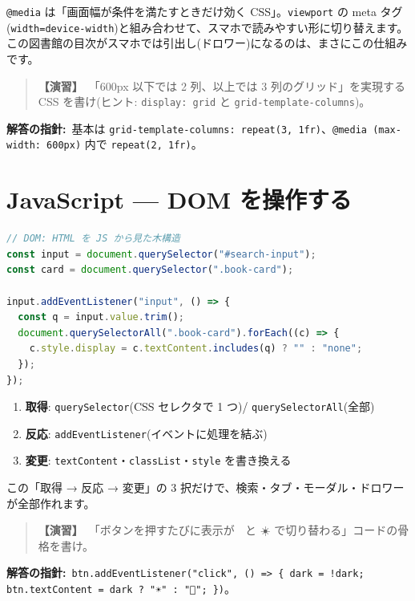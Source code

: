 \documentclass{article}
\begin{document}
\texttt{@media} は「画面幅が条件を満たすときだけ効く CSS」。\texttt{viewport} の meta タグ(\texttt{width=device-width})と組み合わせて、スマホで読みやすい形に切り替えます。この図書館の目次がスマホでは引出し(ドロワー)になるのは、まさにこの仕組みです。

\begin{quote}
\textbf{【演習】}\ 「600px 以下では 2 列、以上では 3 列のグリッド」を実現する CSS を書け(ヒント: \texttt{display: grid} と \texttt{grid-template-columns})。
\end{quote}

\textbf{解答の指針:}\ 基本は \texttt{grid-template-columns: repeat(3, 1fr)}、\texttt{@media (max-width: 600px)} 内で \texttt{repeat(2, 1fr)}。

\section{JavaScript — DOM を操作する}

\begin{lstlisting}[language=JavaScript]
// DOM: HTML を JS から見た木構造
const input = document.querySelector("#search-input");
const card = document.querySelector(".book-card");

input.addEventListener("input", () => {
  const q = input.value.trim();
  document.querySelectorAll(".book-card").forEach((c) => {
    c.style.display = c.textContent.includes(q) ? "" : "none";
  });
});
\end{lstlisting}

\begin{enumerate}
\item \textbf{取得}: \texttt{querySelector}(CSS セレクタで 1 つ)/ \texttt{querySelectorAll}(全部)
\item \textbf{反応}: \texttt{addEventListener}(イベントに処理を結ぶ)
\item \textbf{変更}: \texttt{textContent}・\texttt{classList}・\texttt{style} を書き換える
\end{enumerate}
この「取得 → 反応 → 変更」の 3 択だけで、検索・タブ・モーダル・ドロワーが全部作れます。

\begin{quote}
\textbf{【演習】}\ 「ボタンを押すたびに表示が 🌙 と ☀️ で切り替わる」コードの骨格を書け。
\end{quote}

\textbf{解答の指針:}\ \texttt{btn.addEventListener("click", () => \{ dark = !dark; btn.textContent = dark ? "☀️" : "🌙"; \})}。
\end{document}
